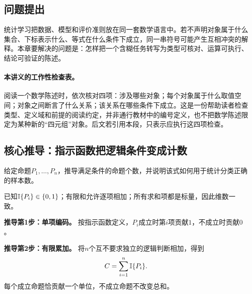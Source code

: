 \subsection*{问题提出}\label{schema:V1-C01:CH-06}
统计学习把数据、模型和评价准则放在同一套数学语言中。若不声明对象属于什么集合、下标表示什么、等式在什么条件下成立，同一串符号可能产生互相冲突的解释。本章要解决的问题是：怎样把一个含糊任务转写为类型可核对、运算可执行、结论可验证的陈述。

\label{def:V1-C01-statement}\label{schema:V1-C01:CH-07}
\paragraph{本讲义的工作性检查表。}
阅读一个数学陈述时，依次核对四项：涉及哪些对象；每个对象属于什么取值空间；对象之间断言了什么关系；该关系在哪些条件下成立。这是一份帮助读者检查类型、定义域和前提的阅读约定，并非通行教材中的编号定义，也不把数学陈述限定为某种新的“四元组”对象。后文若引用本段，只表示应执行这四项检查。

\label{schema:V1-C01:CH-08}
\label{schema:V1-C01:CH-09}
\label{schema:V1-C01:CH-10}

\subsection*{核心推导：指示函数把逻辑条件变成计数}

\begin{derivationgoalbox}\label{schema:V1-C01:CH-11}
给定命题$P_1,\ldots,P_n$，推导满足条件的命题个数，并说明该式如何用于统计分类正确的样本数。
\end{derivationgoalbox}
\begin{derivationprepbox}
已知$\mathbb{I}\{P_i\}\in\{0,1\}$；有限和允许逐项相加；所有求和项都是标量，因此维数一致。
\end{derivationprepbox}
\textbf{推导第1步：单项编码。} 按指示函数定义，$P_i$成立时第$i$项贡献$1$，不成立时贡献$0$。

\textbf{推导第2步：有限累加。} 将$n$个互不要求独立的逻辑判断相加，得到
\[
C=\sum_{i=1}^{n}\mathbb{I}\{P_i\}.
\]
每个成立命题恰贡献一个单位，不成立命题不改变总和。

